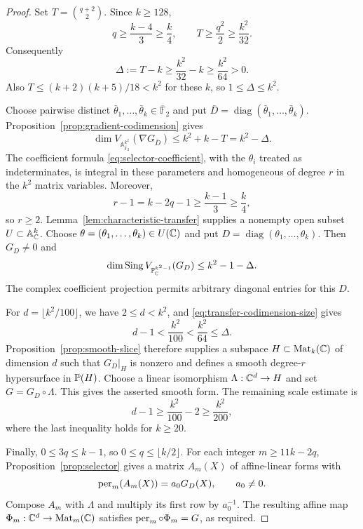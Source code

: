 \begin{proof}
Set \(T=\binom{q+2}{2}\).  Since \(k\ge128\),
\[
 q\ge\frac{k-4}{3}\ge\frac{k}{4},\qquad
 T\ge\frac{q^2}{2}\ge\frac{k^2}{32}.
\]
Consequently
\begin{equation}
 \Delta:=T-k
 \ge\frac{k^2}{32}-k
 \ge\frac{k^2}{64}>0.
 \label{eq:transfer-codimension-size}
\end{equation}
Also \(T\le(k+2)(k+5)/18<k^2\) for these \(k\), so
\(1\le\Delta\le k^2\).

Choose pairwise distinct
\(\bar\theta_1,\ldots,\bar\theta_k\in\overline{\mathbb F}_2\)
and put \(\bar D=\operatorname{diag}(\bar\theta_1,\ldots,\bar\theta_k)\).
Proposition~\ref{prop:gradient-codimension} gives
\[
 \dim V_{\mathbb A^{k^2}_{\overline{\mathbb F}_2}}(\nabla G_{\bar D})
 \le k^2+k-T=k^2-\Delta.
\]
The coefficient formula \eqref{eq:selector-coefficient}, with the
\(\theta_i\) treated as indeterminates, is integral in these parameters
and homogeneous of degree \(r\) in the \(k^2\) matrix variables.
Moreover,
\[
 r-1=k-2q-1
 \ge\frac{k-1}{3}\ge\frac{k}{4},
\]
so \(r\ge2\).  Lemma~\ref{lem:characteristic-transfer} supplies a
nonempty open subset \(U\subset\mathbb A^k_{\mathbb C}\).  Choose
\(\theta=(\theta_1,\ldots,\theta_k)\in U(\mathbb C)\) and put
\(D=\operatorname{diag}(\theta_1,\ldots,\theta_k)\).  Then \(G_D\ne0\)
and
\[
 \dim\operatorname{Sing}V_{\mathbb P^{k^2-1}_{\mathbb C}}(G_D)
 \le k^2-1-\Delta.
\]
The complex coefficient projection permits arbitrary diagonal entries
for this \(D\).

For \(d=\lfloor k^2/100\rfloor\), we have \(2\le d<k^2\), and
\eqref{eq:transfer-codimension-size} gives
\[
 d-1<\frac{k^2}{100}<\frac{k^2}{64}\le\Delta.
\]
Proposition~\ref{prop:smooth-slice} therefore supplies a subspace
\(H\subset\operatorname{Mat}_k(\mathbb C)\) of dimension \(d\) such that \(G_D|_H\)
is nonzero and defines a smooth degree-\(r\) hypersurface in \(\mathbb P(H)\).
Choose a linear isomorphism \(\Lambda:\mathbb C^d\to H\) and set
\(G=G_D\circ\Lambda\).  This gives the asserted smooth form.  The
remaining scale estimate is
\[
 d-1\ge\frac{k^2}{100}-2\ge\frac{k^2}{200},
\]
where the last inequality holds for \(k\ge20\).

Finally, \(0\le3q\le k-1\), so \(0\le q\le\lfloor k/2\rfloor\).
For each integer
\(m\ge11k-2q\), Proposition~\ref{prop:selector} gives a matrix
\(A_m(X)\) of affine-linear forms with
\[
 \operatorname{per}_m(A_m(X))=a_0G_D(X),\qquad a_0\ne0.
\]
Compose \(A_m\) with \(\Lambda\) and multiply its first row by
\(a_0^{-1}\).  The resulting affine map
\(\Phi_m:\mathbb C^d\to\operatorname{Mat}_m(\mathbb C)\) satisfies
\(\operatorname{per}_m\circ\Phi_m=G\), as required.
\end{proof}
